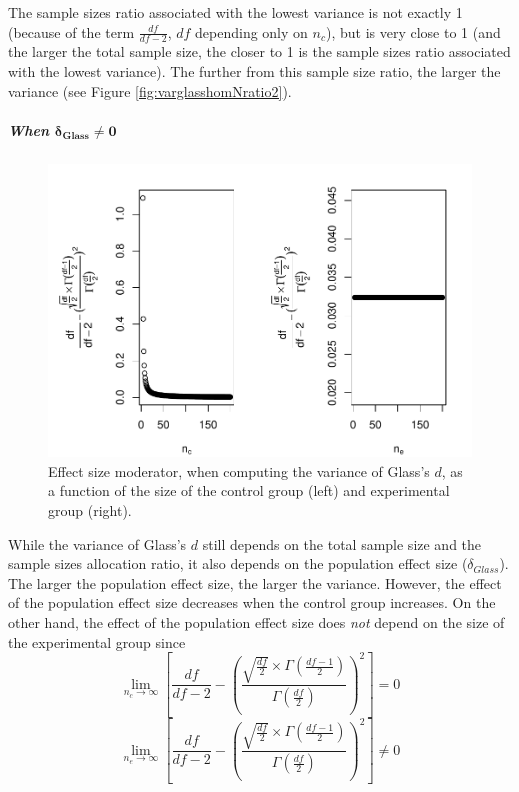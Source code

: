 \documentclass[
  english,
  man,mask]{apa6}
\let\oldsubparagraph\subparagraph
\renewcommand{\subparagraph}[1]{\oldsubparagraph{#1}\mbox{}}
\begin{document}
The sample sizes ratio associated with the lowest variance is not exactly 1 (because of the term \(\frac{df}{df-2}\), \(df\) depending only on \(n_c\)), but is very close to 1 (and the larger the total sample size, the closer to 1 is the sample sizes ratio associated with the lowest variance). The further from this sample size ratio, the larger the variance (see Figure \ref{fig:varglasshomNratio2}).

\hypertarget{when-bmdelta_glass-neq-0}{%
\subparagraph{\texorpdfstring{When \(\bm{\delta_{Glass} \neq 0}\)}{When \textbackslash bm\{\textbackslash delta\_\{Glass\} \textbackslash neq 0\}}}\label{when-bmdelta_glass-neq-0}}

\begin{figure}
\centering
\includegraphics{SupMat1_files/figure-latex/ESmoderatorGlassNsize2-1.pdf}
\caption{\label{fig:ESmoderatorGlassNsize2}Effect size moderator, when computing the variance of Glass's \(d\), as a function of the size of the control group (left) and experimental group (right).}
\end{figure}

While the variance of Glass's \(d\) still depends on the total sample size and the sample sizes allocation ratio, it also depends on the population effect size (\(\delta_{Glass}\)). The larger the population effect size, the larger the variance. However, the effect of the population effect size decreases when the control group increases. On the other hand, the effect of the population effect size does \emph{not} depend on the size of the experimental group since\\
\[\lim_{n_c\rightarrow \infty}\left[\frac{df}{df-2} - \left( \frac{\sqrt{\frac{df}{2}} \times \Gamma \left(\frac{df-1}{2} \right)}{\Gamma \left( \frac{df}{2}\right)}\right)^2 \right]=0\]
\[\lim_{n_e\rightarrow \infty}\left[\frac{df}{df-2} - \left( \frac{\sqrt{\frac{df}{2}} \times \Gamma \left(\frac{df-1}{2} \right)}{\Gamma \left( \frac{df}{2}\right)}\right)^2 \right] \neq 0\]
\end{document}
